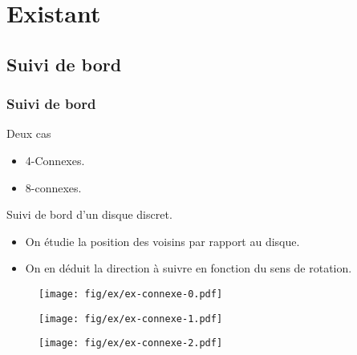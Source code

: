 \section{Existant}

\subsection{Suivi de bord}
\begin{frame}
  \frametitle{Suivi de bord}
    { 
      \begin{block}{Deux cas}
        \begin{itemize}
          \item 4-Connexes.
          \item 8-connexes.
        \end{itemize}
      \end{block} 
    } 
    {
      \begin{block}{Suivi de bord d'un disque discret.}
        \begin{itemize}
          \item On étudie la position des voisins par rapport au disque.
          \item<3> On en déduit la direction à suivre en fonction du sens de rotation.
        \end{itemize}
      \end{block} 
    }
    
    {   
      \begin{figure}[h!]
        \centering
        \texttt{[image: fig/ex/ex-connexe-0.pdf]}
      \end{figure}    
    }
    {     
      \begin{figure}[h!]
        \centering
        \texttt{[image: fig/ex/ex-connexe-1.pdf]}
      \end{figure}    
    }
    {     
      \begin{figure}[h!]
        \centering
        \texttt{[image: fig/ex/ex-connexe-2.pdf]}
      \end{figure}    
    }
\end{frame}

